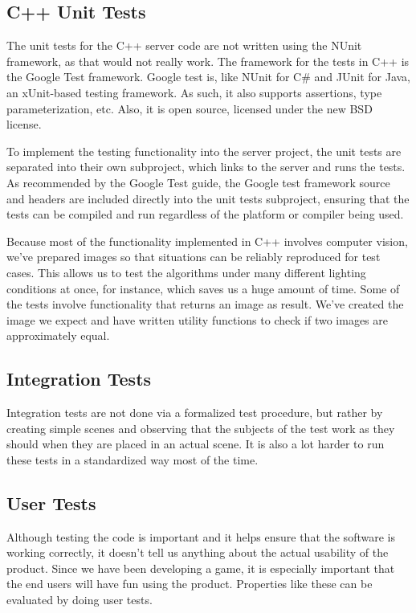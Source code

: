        \subsection{C++ Unit Tests} \label{ssec:cplusplusunittests}
            The unit tests for the C++ server code are not written using the
            NUnit framework, as that would not really work. The framework for
            the tests in C++ is the Google Test framework. Google test is, like
            NUnit for C\# and JUnit for Java, an xUnit-based testing framework.
            As such, it also supports assertions, type parameterization, etc.
            Also, it is open source, licensed under the new BSD license.
            
            To implement the testing functionality into the server project, 
            the unit tests are separated into their own subproject, which 
            links to the server and runs the tests. As recommended by the 
            Google Test guide, the Google test framework source and headers 
            are included directly into the unit tests subproject, ensuring 
            that the tests can be compiled and run regardless of the platform 
            or compiler being used.

            Because most of the functionality implemented in C++ involves
            computer vision, we've prepared images so that situations can be
            reliably reproduced for test cases. This allows us to test the
            algorithms under many different lighting conditions at once, for
            instance, which saves us a huge amount of time. Some of the tests
            involve functionality that returns an image as result. We've created
            the image we expect and have written utility functions to check if
            two images are approximately equal.
        
        \subsection{Integration Tests} \label{ssec:integrationtests}
            Integration tests are not done via a formalized test procedure, but 
            rather by creating simple scenes and observing that the subjects of 
            the test work as they should when they are placed in an actual 
            scene. It is also a lot harder to run these tests in a standardized 
            way most of the time.

        \subsection{User Tests}
            Although testing the code is important and it helps ensure that the
            software is working correctly, it doesn't tell us anything about the
            actual usability of the product. Since we have been developing a game, 
            it is especially important that the end users will have fun using the
            product. Properties like these can be evaluated by doing user tests.

